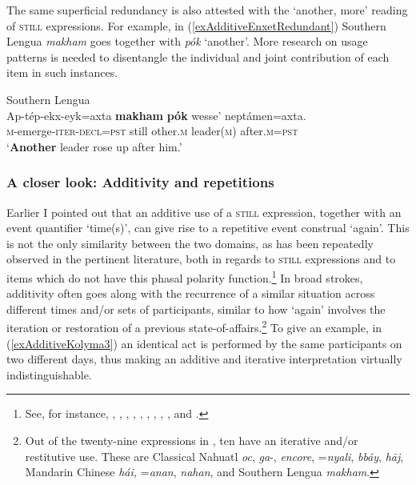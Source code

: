 The same superficial redundancy is also attested with the \lq another, more\rq{ }reading of \textsc{still} expressions. For example, in (\ref{exAdditiveEnxetRedundant}) Southern Lengua \textit{makham} goes together with \textit{pók} \lq another\rq{}. More research on usage patterns is needed to disentangle the individual and joint contribution of each item in such instances.

\begin{exe}
	\ex Southern Lengua\label{exAdditiveEnxetRedundant}\\
	\gll Ap-tép-ekx-eyk=axta \textbf{makham} \textbf{pók} wesse\rq{} neptámen=axta.\\
	\textsc{m}-emerge-\textsc{iter}-\textsc{decl}=\textsc{pst} still other.\textsc{m} leader(\textsc{m}) after.\textsc{m}=\textsc{pst}\\
	\glt \lq \textbf{Another} leader rose up after him.\rq{ }\parencite[462]{Elliot2021}
\end{exe}

\subsubsection{A closer look: Additivity and repetitions} Earlier I pointed out that an additive use of a \textsc{still} expression, together with an event quantifier \lq time(s)\rq{}, can give rise to a repetitive event construal \lq again\rq{}. This is not the only similarity between the two domains, as has been repeatedly observed in the pertinent literature, both in regards to \textsc{still} expressions and to items which do not have this phasal polarity function.\footnote{See, for instance, \textcite{Donazzan2008}, \textcite{Evans1995Mayali}, \textcite[162–163]{MosegaardHansen2008}, \textcite[108–113]{Huang2008}, \textcite{Lichtenberk1991}, \textcite{Liu2000}, \textcite[528–532]{Maslova2003}, \textcite[461]{McGregor1990},  \textcite{TovenaDonazzan2008}, \textcite{Yeh1998} and \textcite{Zhang2017}.} In broad strokes, additivity often goes along with the recurrence of a similar situation across different times and/or sets of participants, similar to how \lq again\rq{ }involves the iteration or restoration of a previous state-of-affairs.\footnote{Out of the twenty-nine expressions in , ten have an iterative and/or restitutive use. These are Classical Nahuatl \textit{oc},  \mbox{\textit{ga}-},  \textit{encore},  \mbox{=\textit{nyali}},  \textit{bbáy},  \textit{hāj}, Mandarin Chinese \textit{hái,}  \mbox{=\textit{anan}},  \textit{nahan}, and Southern Lengua \textit{makham}.} To give an example, in (\ref{exAdditiveKolyma3}) an identical act is performed by the same participants on two different days, thus making an additive and iterative interpretation virtually indistinguishable.

